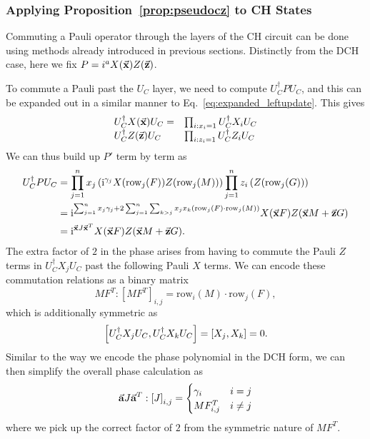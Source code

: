 \subsubsection{Applying Proposition~\ref{prop:pseudocz} to CH States}
Commuting a Pauli operator through the layers of the CH circuit can be done using methods already introduced in previous sections. Distinctly from the DCH case, here we fix $P=i^{a}X(\va{x})Z(\va{z})$.\par
To commute a Pauli past the $U_{C}$ layer, we need to compute $U_{C}^{\dagger}PU_{C}$, and this can be expanded out in a similar manner to Eq.~\ref{eq:expanded_leftupdate}. This gives
\[
\begin{array}{l l}
U_{C}^{\dagger}X(\va{x})U_{C} = & \prod_{i:x_{i}=1}U_{C}^{\dagger}X_{i}U_{C}\\
U_{C}^{\dagger}Z(\va{z})U_{C} & \prod_{i:z_{i}=1}U_{C}^{\dagger}Z_{i}U_{C}
\end{array}
\]
We can thus build up $P'$ term by term as
\begin{align}
U_{C}^{\dagger}PU_{C} &= \prod_{j=1}^{n}x_{j}\left(\mathrm{i}^{\gamma_{j}}X(\text{row}_{j}(F))Z(\text{row}_{j}(M))\right)\prod_{j=1}^{n}z_{i}\left(Z(\text{row}_{j}(G))\right) \nonumber \\
&= \mathrm{i}^{\sum_{j=1}^{n} x_{j}\gamma_{j} + 2\sum_{j=1}^{n}\sum_{k>j}x_{j}x_{k}\left( \text{row}_{j}(F)\cdot\text{row}_{j}(M) \right)}X(\va{x}F)Z(\va{x}M+\va{z}G) \nonumber \\
&= \mathrm{i}^{\va{x}J\va{x}^{T}}X(\va{x}F)Z(\va{x}M+\va{z}G).
\label{eq:tableau_update_pauli}
\end{align}
The extra factor of $2$ in the phase arises from having to commute the Pauli $Z$ terms in $U_{C}^{\dagger}X_{j}U_{C}$ past the following Pauli $X$ terms. We can encode these commutation relations as a binary matrix
\[MF^{T} : \left[MF^{T}\right]_{i,j} = \text{row}_{i}(M)\cdot \text{row}_{j}(F),\]
which is additionally symmetric as 
\[\comm{U_{C}^{\dagger}X_{j}U_{C}}{U_{C}^{\dagger}X_{k}U_{C}} = \comm{X_{j}}{X_{k}} = 0.\]
Similar to the way we encode the phase polynomial in the DCH form, we can then simplify the overall phase calculation as
\[\va{a}J\va{a}^{T} : \left[J\right]_{i,j} = \begin{cases} \gamma_{i} & i=j \\ MF^{T}_{i,j} & i\neq j \end{cases}\]
where we pick up the correct factor of $2$ from the symmetric nature of $MF^{T}$.
